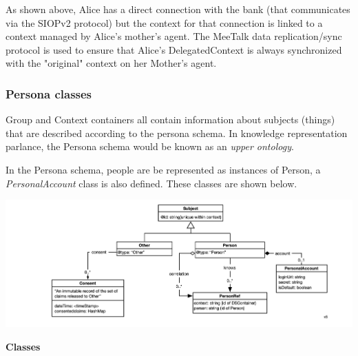 \documentclass[11pt, oneside]{article}   	%
\begin{document}
As shown above, Alice has a direct connection with the bank (that communicates via the SIOPv2 protocol) but the context for that connection is linked to a context managed by Alice's mother's agent. The MeeTalk data replication/sync protocol is used to ensure that Alice's DelegatedContext is always synchronized with the "original" context on her Mother's agent.

\subsubsection{Persona classes}

Group and Context containers all contain information about subjects (things) that are described according to the persona schema. In knowledge representation parlance, the Persona schema would be known as an \emph{upper ontology}.

In the Persona schema, people are be represented as instances of Person, a \emph{PersonalAccount} class is also defined. These classes are shown below. 

\includegraphics[width=\textwidth]{./images/persona-classes.png}

\textbf{Classes}
\end{document}
